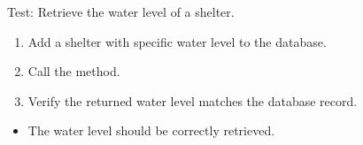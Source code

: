 \documentclass[letterpaper,10pt,english]{sphinxmanual}
\begin{document}
\begin{fulllineitems}
\label{\detokenize{test:test.test_shelter.test_get_shelter_water_level_success}}
\pysigstartsignatures
\pysiglinewithargsret
{}
{}
{}
\pysigstopsignatures
\sphinxAtStartPar
Test: Retrieve the water level of a shelter.
\begin{description}
\begin{enumerate}
%
\item {} 
\sphinxAtStartPar
Add a shelter with specific water level to the database.

\item {} 
\sphinxAtStartPar
Call the  method.

\item {} 
\sphinxAtStartPar
Verify the returned water level matches the database record.

\end{enumerate}

\begin{itemize}
\item {} 
\sphinxAtStartPar
The water level should be correctly retrieved.

\end{itemize}

\end{description}

\end{fulllineitems}

\end{document}
